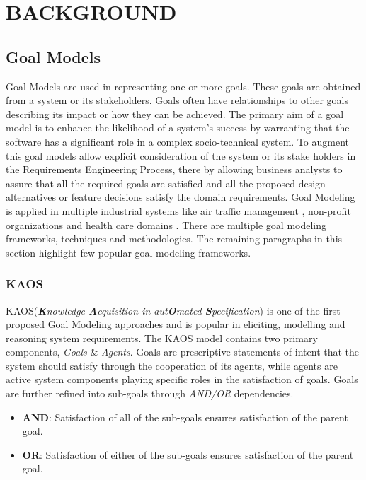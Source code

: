 \chapter{BACKGROUND}
\label{chap:bg}

\section{Goal Models}
\label{sec:bg:gm}
Goal Models are used in representing one or more goals. These goals are obtained from a system or its stakeholders. Goals often have relationships to other goals describing its impact or how they can be achieved. The primary aim of a goal model is to enhance the likelihood of a system's success by warranting that the software has a significant role in a complex socio-technical system. To augment this goal models allow explicit consideration of the system or its stake holders in the Requirements Engineering Process, there by allowing business analysts to assure that all the required goals are satisfied and all the proposed design alternatives or feature decisions satisfy the domain requirements. Goal Modeling is applied in multiple industrial systems like air traffic management \cite{maiden04}, non-profit organizations \cite{horkoff09} and health care domains \cite{anY09}. There are multiple goal modeling frameworks, techniques and methodologies. The remaining paragraphs in this section highlight few popular goal modeling frameworks.

\subsection{KAOS}
\label{subsec:bg:gm:kaos}
KAOS(\textit{\textbf{K}nowledge \textbf{A}cquisition in aut\textbf{O}mated \textbf{S}pecification}) is one of the first proposed Goal Modeling approaches \cite{van09} and is popular in eliciting, modelling and reasoning system requirements. The KAOS model contains two primary components, \textit{Goals} \& \textit{Agents}. Goals are prescriptive statements of intent that the system should satisfy through the cooperation of its agents, while agents are active system components playing specific roles in the satisfaction of goals. Goals are further refined into sub-goals through \textit{AND/OR} dependencies.
\begin{itemize}
    \item \textbf{AND}: Satisfaction of all of the sub-goals ensures satisfaction of the parent goal.
    \item \textbf{OR}: Satisfaction of either of the sub-goals ensures satisfaction of the parent  goal.
\end{itemize}

